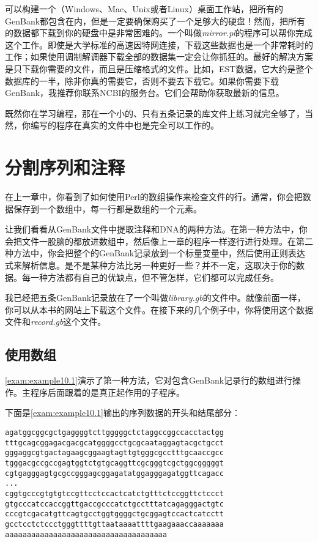 可以构建一个（Windows、Mac、Unix或者Linux）桌面工作站，把所有的GenBank都包含在内，但是一定要确保购买了一个足够大的硬盘！然而，把所有的数据都下载到你的硬盘中是非常困难的。一个叫做\textit{mirror.pl}的程序可以帮你完成这个工作。即使是大学标准的高速因特网连接，下载这些数据也是一个非常耗时的工作；如果使用调制解调器下载全部的数据集一定会让你抓狂的。最好的解决方案是只下载你需要的文件，而且是压缩格式的文件。比如，EST数据，它大约是整个数据库的一半，除非你真的需要它，否则不要去下载它。如果你需要下载GenBank，我推荐你联系NCBI的服务台。它们会帮助你获取最新的信息。

既然你在学习编程，那在一个小的、只有五条记录的库文件上练习就完全够了，当然，你编写的程序在真实的文件中也是完全可以工作的。

\section{分割序列和注释}
在上一章中，你看到了如何使用Perl的数组操作来检查文件的行。通常，你会把数据保存到一个数组中，每一行都是数组的一个元素。

让我们看看从GenBank文件中提取注释和DNA的两种方法。在第一种方法中，你会把文件一股脑的都放进数组中，然后像上一章的程序一样逐行进行处理。在第二种方法中，你会把整个的GenBank记录放到一个标量变量中，然后使用正则表达式来解析信息。是不是某种方法比另一种更好一些？并不一定，这取决于你的数据。每一种方法都有自己的优缺点，但不管怎样，它们都可以完成任务。

我已经把五条GenBank记录放在了一个叫做\textit{library.gb}的文件中。就像前面一样，你可以从本书的网站上下载这个文件。在接下来的几个例子中，你将使用这个数据文件和\textit{record.gb}这个文件。

\subsection{使用数组}
\autoref{exam:example10.1}演示了第一种方法，它对包含GenBank记录行的数组进行操作。主程序后面跟着的是真正起作用的子程序。



下面是\autoref{exam:example10.1}输出的序列数据的开头和结尾部分：

\begin{lstlisting}
agatggcggcgctgaggggtcttgggggctctaggccggccacctactgg
tttgcagcggagacgacgcatggggcctgcgcaataggagtacgctgcct
gggaggcgtgactagaagcggaagtagttgtgggcgcctttgcaaccgcc
tgggacgccgccgagtggtctgtgcaggttcgcgggtcgctggcgggggt
cgtgagggagtgcgccgggagcggagatatggagggagatggttcagacc
...
cggtgcccgtgtgtccgttcctccactcatctgtttctccggttctccct
gtgcccatccaccggttgaccgcccatctgcctttatcagagggactgtc
cccgtcgacatgttcagtgcctggtggggctgcggagtccactcatcctt
gcctcctctccctgggttttgttaataaaattttgaagaaaccaaaaaaa
aaaaaaaaaaaaaaaaaaaaaaaaaaaaaaaaaaaaa
\end{lstlisting}

